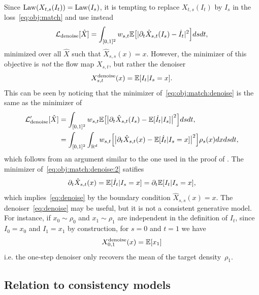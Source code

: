 Since $\operatorname{Law}(X_{t,s}(I_t)) = \operatorname{Law}(I_s)$, it is tempting to replace $X_{t,s}(I_t)$ by $I_s$ in the loss~\eqref{eq:obj:match} and use instead
\begin{equation}
	\label{eq:obj:match:denoise}
	\mathcal{L}_{\text{denoise}}[\hat X] = \int_{[0,1]^2} w_{s,t} \mathbb{E}\big [| \partial_t \hat X_{s,t} (I_s) - \dot I_t|^2 \Big]  ds dt,
\end{equation}
minimized over all $\hat X$ such that $\hat X_{s,s}(x)=x$.
%
However, the minimizer of this objective is \textit{not} the flow map $X_{s,t}$, but rather the denoiser
\begin{equation}
	\label{eq:denoise}
	X^{\text{denoise}}_{s,t}(x) = \mathbb{E} [ I_t| I_s = x].
\end{equation}
This can be seen by noticing  that  the minimizer of~\eqref{eq:obj:match:denoise} is the same as the minimizer of
\begin{equation}
	\label{eq:obj:match:denoise:2}
	\begin{aligned}
		\mathcal{L}'_{\text{denoise}}[\hat X] & = \int_{[0,1]^2} w_{s,t} \mathbb{E}\big [\big| \partial_t \hat X_{s,t} (I_s) - \mathbb{E}[\dot I_t|I_s]\big|^2 \Big]  ds dt,                      \\
		                                & = \int_{[0,1]^2} \int_{\mathbb{R}^d}w_{s,t} \Big [\big| \partial_t \hat X_{s,t} (x) - \mathbb{E}[\dot I_t|I_s=x]\big|^2 \Big] \rho_s(x) dx ds dt,
	\end{aligned}
\end{equation}
which follows from an argument similar to the one used in the proof of . The minimizer of~\eqref{eq:obj:match:denoise:2} satifies
\begin{equation}
	\label{eq:denoise:diff}
	\partial_t \hat X_{s,t}(x) = \mathbb{E} [ \dot I_t| I_s = x] = \partial_t \mathbb{E} [ I_t| I_s = x],
\end{equation}
which implies~\eqref{eq:denoise} by the boundary condition $\hat X_{s,s}(x) = x$.
%
The denoiser~\eqref{eq:denoise} may be useful, but it is not a consistent generative model.
%
For instance, if $x_0\sim\rho_0$ and $x_1\sim \rho_1$ are independent in the definition of $I_t$, since $I_0=x_0$ and $I_1=x_1$ by construction, for $s=0$ and $t=1$ we have
\begin{equation}
	\label{eq:denoise:onestep}
	X^{\text{denoise}}_{0,1}(x) = \mathbb{E} [x_1]
\end{equation}
i.e. the one-step denoiser only recovers the mean of the target density~$\rho_1$.

\subsection{Relation to consistency models}
